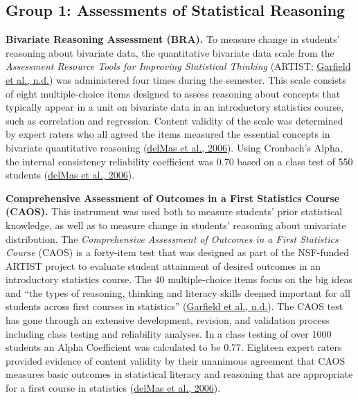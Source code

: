 \documentclass[11pt]{umnthesis}
\begin{document}
\hypertarget{assess-statreason}{%
\subsection{Group 1: Assessments of Statistical Reasoning}\label{assess-statreason}}

\textbf{Bivariate Reasoning Assessment (BRA).} To measure change in students' reasoning about bivariate data, the quantitative bivariate data scale from the \emph{Assessment Resource Tools for Improving Statistical Thinking} (ARTIST; \protect\hyperlink{ref-garfield:nd}{Garfield et al., n.d.}) was administered four times during the semester. This scale consists of eight multiple-choice items designed to assess reasoning about concepts that typically appear in a unit on bivariate data in an introductory statistics course, such as correlation and regression. Content validity of the scale was determined by expert raters who all agreed the items measured the essential concepts in bivariate quantitative reasoning (\protect\hyperlink{ref-delmas:2006}{delMas et al., 2006}). Using Cronbach's Alpha, the internal consistency reliability coefficient was 0.70 based on a class test of 550 students (\protect\hyperlink{ref-delmas:2006}{delMas et al., 2006}).

\textbf{Comprehensive Assessment of Outcomes in a First Statistics Course (CAOS).} This instrument was used both to measure students' prior statistical knowledge, as well as to measure change in students' reasoning about univariate distribution. The \emph{Comprehensive Assessment of Outcomes in a First Statistics Course} (CAOS) is a forty-item test that was designed as part of the NSF-funded ARTIST project to evaluate student attainment of desired outcomes in an introductory statistics course. The 40 multiple-choice items focus on the big ideas and ``the types of reasoning, thinking and literacy skills deemed important for all students across first courses in statistics'' (\protect\hyperlink{ref-garfield:nd}{Garfield et al., n.d.}). The CAOS test has gone through an extensive development, revision, and validation process including class testing and reliability analyses. In a class testing of over 1000 students an Alpha Coefficient was calculated to be 0.77. Eighteen expert raters provided evidence of content validity by their unanimous agreement that CAOS measures basic outcomes in statistical literacy and reasoning that are appropriate for a first course in statistics (\protect\hyperlink{ref-delmas:2006}{delMas et al., 2006}).
\end{document}
